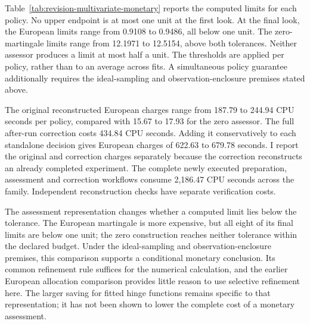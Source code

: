 \documentclass[11pt]{article}
\begin{document}
Table~\ref{tab:revision-multivariate-monetary} reports the computed limits for each policy. No upper endpoint is at most one unit at the first look. At the final look, the European limits range from 0.9108 to 0.9486, all below one unit. The zero-martingale limits range from 12.1971 to 12.5154, above both tolerances. Neither assessor produces a limit at most half a unit. The thresholds are applied per policy, rather than to an average across fits. A simultaneous policy guarantee additionally requires the ideal-sampling and observation-enclosure premises stated above.

The original reconstructed European charges range from 187.79 to 244.94 CPU seconds per policy, compared with 15.67 to 17.93 for the zero assessor. The full after-run correction costs 434.84 CPU seconds. Adding it conservatively to each standalone decision gives European charges of 622.63 to 679.78 seconds. I report the original and correction charges separately because the correction reconstructs an already completed experiment. The complete newly executed preparation, assessment and correction workflows consume 2,186.47 CPU seconds across the family. Independent reconstruction checks have separate verification costs.

The assessment representation changes whether a computed limit lies below the tolerance. The European martingale is more expensive, but all eight of its final limits are below one unit; the zero construction reaches neither tolerance within the declared budget. Under the ideal-sampling and observation-enclosure premises, this comparison supports a conditional monetary conclusion. Its common refinement rule suffices for the numerical calculation, and the earlier European allocation comparison provides little reason to use selective refinement here. The larger saving for fitted hinge functions remains specific to that representation; it has not been shown to lower the complete cost of a monetary assessment.
\end{document}
